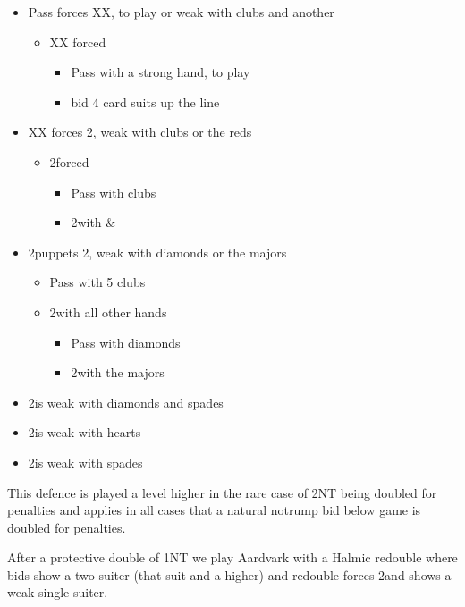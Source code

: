 \documentclass[a4paper,14pt]{extarticle}
\begin{document}
\begin{itemize}
\item Pass forces XX, to play or weak with clubs and another
	\begin{itemize}
	\item XX forced
		\begin{itemize}
		\item Pass with a strong hand, to play
		\item bid 4 card suits up the line
		\end{itemize}
	\end{itemize}
\item XX forces 2\clubs, weak with clubs or the reds
	\begin{itemize}
	\item 2\clubs forced
		\begin{itemize}
		\item Pass with clubs
		\item 2\diamonds with \diamonds\&\hearts
		\end{itemize}
	\end{itemize}
\item 2\clubs puppets 2\diamonds, weak with diamonds or the majors
	\begin{itemize}
	\item Pass with 5 clubs
	\item 2\diamonds with all other hands
		\begin{itemize}
		\item Pass with diamonds
		\item 2\hearts with the majors
		\end{itemize}
	\end{itemize}
\item 2\diamonds is weak with diamonds and spades
\item 2\hearts is weak with hearts
\item 2\spades is weak with spades
\end{itemize}

This defence is played a level higher in the rare case of 2NT being doubled for
penalties and applies in all cases that a natural notrump bid below game is doubled for
penalties.

\label{note:21}

After a protective double of 1NT we play Aardvark with a Halmic redouble where
bids show a two suiter (that suit and a higher) and redouble forces 2\clubs and shows a weak single-suiter.

\label{note:15}
\end{document}
